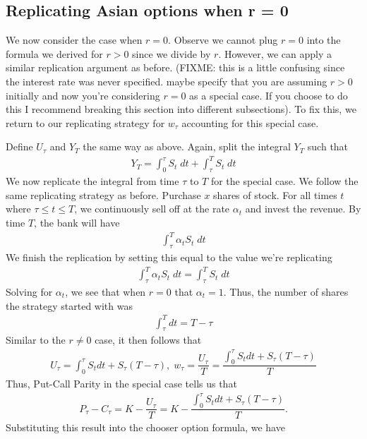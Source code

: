 \documentclass[reqno]{amsart}
\begin{document}
\subsection{Replicating Asian options when r = 0}
We now consider the case when $r=0$. Observe we cannot plug $r=0$ into the formula we derived for $r>0$ since we divide by $r$.
However, we can apply a similar replication argument as before. (FIXME: this is a little confusing since the interest rate was never specified. maybe specify that you are assuming $r > 0$ initially and now you're considering $r = 0$ as a special case. If you choose to do this I recommend breaking this section into different subsections).
To fix this, we return to our replicating strategy for $w_\tau$ accounting for this special case.

Define $U_\tau$ and $Y_T$ the same way as above. Again, split the integral $Y_T$ such that
\begin{align}
     Y_T = \int_0^\tau S_t \; dt + \int_\tau^T S_t \; dt
\end{align}
We now replicate the integral from time $\tau$ to $T$ for the special case. We follow the same replicating strategy as before. Purchase $x$ shares of stock. For all times $t$ where $\tau \leq t \leq T$, we continuously sell off at the rate $\alpha_t$ and invest the revenue. 
By time $T$, the bank will have 
\begin{align}
     \int_\tau^T \alpha_t S_t \; dt
\end{align}
We finish the replication by setting this equal to the value we're replicating
\begin{align}
     \int_\tau^T \alpha_t S_t \; dt = \int_\tau^T S_t \; dt
\end{align}
Solving for $\alpha_t$, we see that when $r = 0$ that $\alpha_t = 1$. Thus, the number of shares the strategy started with was
\begin{align}
     \int_\tau^T dt = T - \tau
\end{align}
Similar to the $r \neq 0$ case, it then follows that
\begin{align}
     U_\tau = \int_0^\tau S_t dt + S_\tau (T - \tau), \; w_\tau = \dfrac{U_\tau}{T} = \dfrac{\int_0^\tau S_t dt + S_\tau (T - \tau)}{T}
\end{align}
Thus, Put-Call Parity in the special case tells us that 
\begin{align}
     P_\tau - C_\tau = K - \dfrac{U_\tau}{T} = K - \dfrac{\int_0^\tau S_t dt + S_\tau (T - \tau)}{T}.
\end{align}
Substituting this result into the chooser option formula, we have
\end{document}
